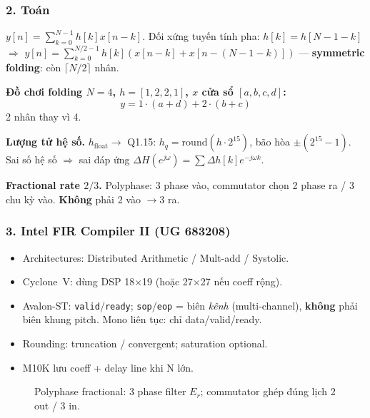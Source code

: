 \subsubsection*{2. Toán}
$y[n]=\sum_{k=0}^{N-1}h[k]x[n-k]$. Đối xứng tuyến tính pha: $h[k]=h[N-1-k]$ $\Rightarrow$ $y[n]=\sum_{k=0}^{N/2-1}h[k](x[n-k]+x[n-(N-1-k)])$ --- \textbf{symmetric folding}: còn $\lceil N/2\rceil$ nhân.

\noindent\textbf{Đồ chơi folding $N=4$, $h=[1,2,2,1]$, $x$ cửa sổ $[a,b,c,d]$:}
\[
y=1\cdot(a+d)+2\cdot(b+c)
\]
2 nhân thay vì 4.

\noindent\textbf{Lượng tử hệ số.} $h_{\mathrm{float}}\to$ Q1.15: $h_q=\mathrm{round}(h\cdot2^{15})$, bão hòa $\pm(2^{15}-1)$. Sai số hệ số $\Rightarrow$ sai đáp ứng $\Delta H(e^{j\omega})=\sum\Delta h[k]e^{-j\omega k}$.

\noindent\textbf{Fractional rate $2/3$.} Polyphase: 3 phase vào, commutator chọn 2 phase ra / 3 chu kỳ vào. \textbf{Không} phải 2 vào $\to$3 ra.

\subsubsection*{3. Intel FIR Compiler II (UG 683208)}
\begin{itemize}\setlength{\itemsep}{1pt}
\item Architectures: Distributed Arithmetic / Mult-add / Systolic.
\item Cyclone~V: dùng DSP 18$\times$19 (hoặc 27$\times$27 nếu coeff rộng).
\item Avalon-ST: \texttt{valid}/\texttt{ready}; \texttt{sop}/\texttt{eop} = biên \emph{kênh} (multi-channel), \textbf{không} phải biên khung pitch. Mono liên tục: chỉ data/valid/ready.
\item Rounding: truncation / convergent; saturation optional.
\item M10K lưu coeff + delay line khi N lớn.
\end{itemize}

\begin{figure}[H]
\centering
{}
\caption{Polyphase fractional: 3 phase filter $E_r$; commutator ghép đúng lịch 2 out / 3 in.}
\end{figure}

